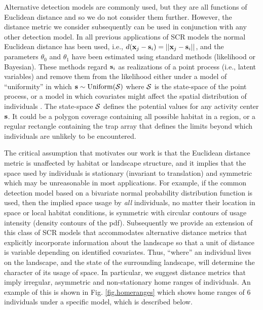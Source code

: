 \documentclass[12pt]{article}
\begin{document}
\begin{spacing}{1.8}
Alternative detection models are commonly used, but they are all
functions of Euclidean distance and so we do not consider them
further. However, the distance metric we consider subsequently can be
used in conjunction with any other detection model.  In all previous
applications of SCR models the normal Euclidean distance has been
used, i.e., $ d({\bf x}_{j} - {\bf s}_{i}) = ||{\bf x}_{j} - {\bf
  s}_{i}||$, and the parameters $\theta_0$ and $\theta_1$ have been
estimated using standard methods (likelihood or Bayesian). These
methods regard ${\bf s}_{i}$ as realizations of a point process (i.e.,
latent variables) and remove them from the likelihood either under a
model of ``uniformity'' in which ${\bf s} \sim \mbox{Uniform}({\cal
  S})$ where ${\cal S}$ is the state-space of the point process, or a
model in which covariates might affect the spatial distribution of
individuals \citep{borchers_efford:2008}. The state-space ${\cal S}$
defines the potential values for any activity center ${\bf s}$.  It
could be a polygon coverage containing all possible habitat in a
region, or a regular rectangle containing the trap array that defines
the limits beyond which individuals are unlikely to be encountered.

The critical assumption that motivates our work is that the Euclidean
distance metric is unaffected by habitat or landscape structure, and
it implies that the space used by individuals is stationary (invariant
to translation) and symmetric
which may be unreasonable in most applications.  For example, if the
common detection model based on a bivariate normal probability
distribution function is used, then the implied space usage by {\it
  all} individuals, no matter their location in space or local habitat
conditions, is symmetric with circular contours of usage intensity
(density contours of the pdf).  Subsequently we provide an extension
of this class of SCR models that accommodates alternative distance
metrics that explicitly incorporate information about the landscape so
that a unit of distance is variable depending on identified
covariates. Thus, ``where'' an individual lives on the landscape, and
the state of the surrounding landscape, will determine the character
of its usage of space. In particular, we suggest distance metrics that
imply irregular, asymmetric and non-stationary home ranges of
individuals. An example of this is shown in Fig. \ref{fig.homeranges}
which shows home ranges of 6 individuals under a specific model, which
is described below.




\end{spacing}
\end{document}
